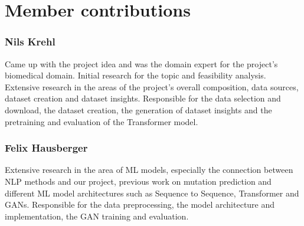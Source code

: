 \section*{Member contributions}

\subsubsection*{Nils Krehl}

Came up with the project idea and was the domain expert for the project's biomedical domain. Initial research for the topic and feasibility analysis.
Extensive research in the areas of the project's overall composition, data sources, dataset creation and dataset insights.
Responsible for the data selection and download, the dataset creation, the generation of dataset insights and the pretraining and evaluation of the Transformer model.

\subsubsection*{Felix Hausberger}

Extensive research in the area of ML models, especially the connection between NLP methods and our project, previous work on mutation prediction and different ML model architectures such as Sequence to Sequence, Transformer and GANs.
Responsible for the data preprocessing, the model architecture and implementation, the GAN training and evaluation.